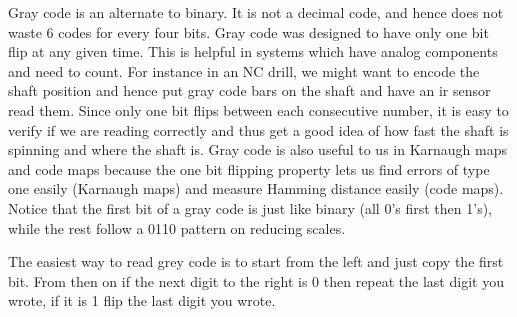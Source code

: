 Gray code is an alternate to binary.  It is not a decimal code, and hence does not waste 6 codes for every four bits.  Gray code was designed to have only one bit flip at any given time.  This is helpful in systems which have analog components and need to count.  For instance in an NC drill, we might want to encode the shaft position and hence put gray code bars on the shaft and have an ir sensor read them.  Since only one bit flips between each consecutive number, it is easy to verify if we are reading correctly and thus get a good idea of how fast the shaft is spinning and where the shaft is.  Gray code is also useful to us in Karnaugh maps and code maps because the one bit flipping property lets us find errors of type one easily (Karnaugh maps) and measure Hamming distance easily (code maps).  Notice that the first bit of a gray code is just like binary (all 0's first then 1's), while the rest follow a 0110 pattern on reducing scales.

The easiest way to read grey code is to start from the left and just copy the first bit.  From then on if the next digit to the right is 0 then repeat the last digit you wrote, if it is 1 flip the last digit you wrote.

